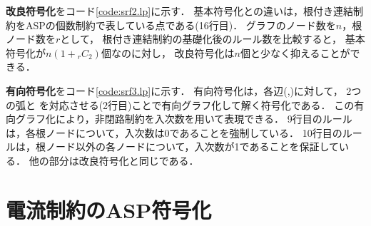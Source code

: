 
%
\textbf{改良符号化}をコード\ref{code:srf2.lp}に示す．
基本符号化との違いは，根付き連結制約をASPの個数制約で表している点である(16行目)．
グラフのノード数を$n$，根ノード数を$r$として，
根付き連結制約の基礎化後のルール数を比較すると，
基本符号化が$n(1+{}_{r}C_{2})$個なのに対し，
改良符号化は$n$個と少なく抑えることができる．
 
\textbf{有向符号化}をコード\ref{code:srf3.lp}に示す．
有向符号化は，各辺(,)に対して，
2つの弧と
を対応させる(2行目)ことで有向グラフ化して解く符号化である．
この有向グラフ化により，非閉路制約を入次数を用いて表現できる．
9行目のルールは，各根ノードについて，入次数は0であることを強制している．
10行目のルールは，根ノード以外の各ノードについて，入次数が1であることを保証している．
他の部分は改良符号化と同じである．

\section{電流制約のASP符号化}\label{chap:electrical}



